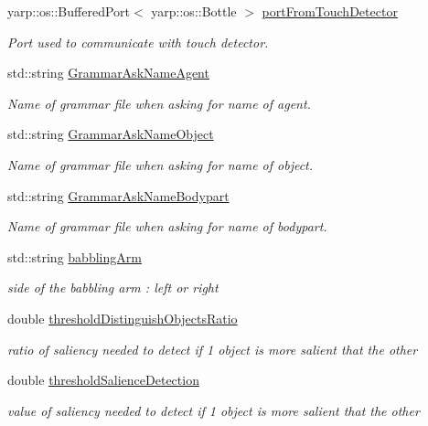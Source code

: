 \begin{DoxyCompactItemize}
yarp\+::os\+::\+Buffered\+Port$<$ yarp\+::os\+::\+Bottle $>$ \hyperlink{classproactiveTagging_af8b98de7b5bd419ad166a343922924c2}{port\+From\+Touch\+Detector}
\begin{DoxyCompactList}\small\item\em Port used to communicate with touch detector. \end{DoxyCompactList}\item 
std\+::string \hyperlink{classproactiveTagging_a73f0a523a12bdbb43a78e729b567d416}{Grammar\+Ask\+Name\+Agent}
\begin{DoxyCompactList}\small\item\em Name of grammar file when asking for name of agent. \end{DoxyCompactList}\item 
std\+::string \hyperlink{classproactiveTagging_a144b3a62457fae75af0950e223bfdb01}{Grammar\+Ask\+Name\+Object}
\begin{DoxyCompactList}\small\item\em Name of grammar file when asking for name of object. \end{DoxyCompactList}\item 
std\+::string \hyperlink{classproactiveTagging_a50b13e3330905f1b19c6a16b94bc67b6}{Grammar\+Ask\+Name\+Bodypart}
\begin{DoxyCompactList}\small\item\em Name of grammar file when asking for name of bodypart. \end{DoxyCompactList}\item 
std\+::string \hyperlink{classproactiveTagging_a77047c3a21e39d1aa6a6d0f656707621}{babbling\+Arm}
\begin{DoxyCompactList}\small\item\em side of the babbling arm \+: left or right \end{DoxyCompactList}\item 
double \hyperlink{classproactiveTagging_a6586dc8849953aa36aa0cb88ade14bf0}{threshold\+Distinguish\+Objects\+Ratio}
\begin{DoxyCompactList}\small\item\em ratio of saliency needed to detect if 1 object is more salient that the other \end{DoxyCompactList}\item 
double \hyperlink{classproactiveTagging_a5e506aa6021526fb0665711593a5797c}{threshold\+Salience\+Detection}
\begin{DoxyCompactList}\small\item\em value of saliency needed to detect if 1 object is more salient that the other \end{DoxyCompactList}\end{DoxyCompactItemize}


